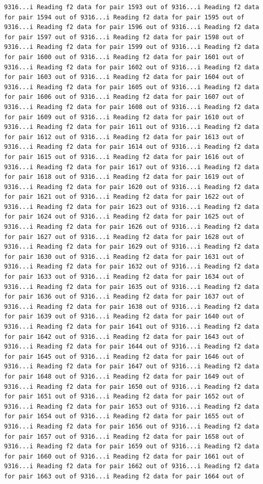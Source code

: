 \documentclass[
]{article}
\begin{document}
\begin{verbatim}
9316...i Reading f2 data for pair 1593 out of 9316...i Reading f2 data for pair 1594 out of 9316...i Reading f2 data for pair 1595 out of 9316...i Reading f2 data for pair 1596 out of 9316...i Reading f2 data for pair 1597 out of 9316...i Reading f2 data for pair 1598 out of 9316...i Reading f2 data for pair 1599 out of 9316...i Reading f2 data for pair 1600 out of 9316...i Reading f2 data for pair 1601 out of 9316...i Reading f2 data for pair 1602 out of 9316...i Reading f2 data for pair 1603 out of 9316...i Reading f2 data for pair 1604 out of 9316...i Reading f2 data for pair 1605 out of 9316...i Reading f2 data for pair 1606 out of 9316...i Reading f2 data for pair 1607 out of 9316...i Reading f2 data for pair 1608 out of 9316...i Reading f2 data for pair 1609 out of 9316...i Reading f2 data for pair 1610 out of 9316...i Reading f2 data for pair 1611 out of 9316...i Reading f2 data for pair 1612 out of 9316...i Reading f2 data for pair 1613 out of 9316...i Reading f2 data for pair 1614 out of 9316...i Reading f2 data for pair 1615 out of 9316...i Reading f2 data for pair 1616 out of 9316...i Reading f2 data for pair 1617 out of 9316...i Reading f2 data for pair 1618 out of 9316...i Reading f2 data for pair 1619 out of 9316...i Reading f2 data for pair 1620 out of 9316...i Reading f2 data for pair 1621 out of 9316...i Reading f2 data for pair 1622 out of 9316...i Reading f2 data for pair 1623 out of 9316...i Reading f2 data for pair 1624 out of 9316...i Reading f2 data for pair 1625 out of 9316...i Reading f2 data for pair 1626 out of 9316...i Reading f2 data for pair 1627 out of 9316...i Reading f2 data for pair 1628 out of 9316...i Reading f2 data for pair 1629 out of 9316...i Reading f2 data for pair 1630 out of 9316...i Reading f2 data for pair 1631 out of 9316...i Reading f2 data for pair 1632 out of 9316...i Reading f2 data for pair 1633 out of 9316...i Reading f2 data for pair 1634 out of 9316...i Reading f2 data for pair 1635 out of 9316...i Reading f2 data for pair 1636 out of 9316...i Reading f2 data for pair 1637 out of 9316...i Reading f2 data for pair 1638 out of 9316...i Reading f2 data for pair 1639 out of 9316...i Reading f2 data for pair 1640 out of 9316...i Reading f2 data for pair 1641 out of 9316...i Reading f2 data for pair 1642 out of 9316...i Reading f2 data for pair 1643 out of 9316...i Reading f2 data for pair 1644 out of 9316...i Reading f2 data for pair 1645 out of 9316...i Reading f2 data for pair 1646 out of 9316...i Reading f2 data for pair 1647 out of 9316...i Reading f2 data for pair 1648 out of 9316...i Reading f2 data for pair 1649 out of 9316...i Reading f2 data for pair 1650 out of 9316...i Reading f2 data for pair 1651 out of 9316...i Reading f2 data for pair 1652 out of 9316...i Reading f2 data for pair 1653 out of 9316...i Reading f2 data for pair 1654 out of 9316...i Reading f2 data for pair 1655 out of 9316...i Reading f2 data for pair 1656 out of 9316...i Reading f2 data for pair 1657 out of 9316...i Reading f2 data for pair 1658 out of 9316...i Reading f2 data for pair 1659 out of 9316...i Reading f2 data for pair 1660 out of 9316...i Reading f2 data for pair 1661 out of 9316...i Reading f2 data for pair 1662 out of 9316...i Reading f2 data for pair 1663 out of 9316...i Reading f2 data for pair 1664 out of 
\end{verbatim}
\end{document}
